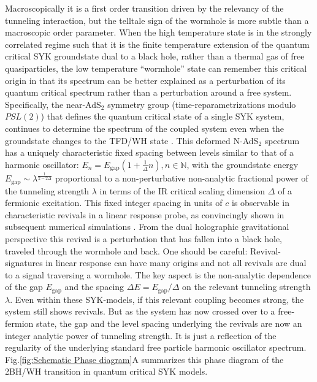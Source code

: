 Macroscopically it is a first order transition driven by the relevancy of the tunneling interaction, but the telltale sign of the wormhole is more subtle than a macroscopic order parameter. When the high temperature state is %
in the strongly correlated regime such that it is the finite temperature extension of the quantum critical SYK groundstate dual to a black hole, rather than a thermal gas of free quasiparticles, the low temperature ``wormhole'' state can remember this critical origin in that its spectrum can be better explained as a perturbation of its quantum critical spectrum rather than a perturbation around a free system. Specifically, the near-AdS$_2$ symmetry group (time-reparametrizations modulo $PSL(2)$) that defines the quantum critical state of a single SYK system, continues to determine the spectrum of the coupled system even when the groundstate changes to the TFD/WH state \cite{maldacena2018eternal}. This deformed N-AdS$_2$ spectrum has a uniquely characteristic fixed spacing between levels similar to that of a harmonic oscillator: $E_n = E_{\text{gap}}(1+ \frac{1}{\Delta}n), n \in \mathbb{N}$, with the groundstate energy $E_{\text{gap}}\sim \lambda^{\frac{1}{2-2\Delta}}$ proportional to a non-perturbative non-analytic fractional power of the tunneling strength $\lambda$ in terms of the IR critical scaling dimension $\Delta$ of a fermionic excitation. This fixed integer spacing in units of $c$ is observable in characteristic revivals in a linear response probe, as convincingly shown in subsequent numerical simulations \cite{maldacenaSYKWormholeFormation2020a,pluggeRevivalDynamicsTraversable2020a,sahooTraversableWormholeHawkingPage2020,qiCoupledSYKModel2020a}. %
From the dual holographic gravitational perspective this revival is a perturbation that has fallen into a black hole, traveled through the wormhole and back. One should be careful: Revival-signatures in linear response can have many origins and not all revivals are dual to a signal traversing a wormhole. The key aspect is the non-analytic dependence of the gap $E_{\text{gap}}$ and the spacing $\Delta E =E_{\text{gap}}/\Delta$ on the relevant tunneling strength $\lambda$. Even within these SYK-models, if this relevant coupling becomes strong, the system still shows revivals. But as the system has now crossed over to a free-fermion state, the gap and the level spacing underlying the revivals are now an integer analytic power of tunneling strength. It is just a reflection of the regularity of the underlying standard free particle harmonic oscillator spectrum. 
Fig.\ref{fig:Schematic Phase diagram}A summarizes this phase diagram of the 2BH/WH transition in quantum critical SYK models.




